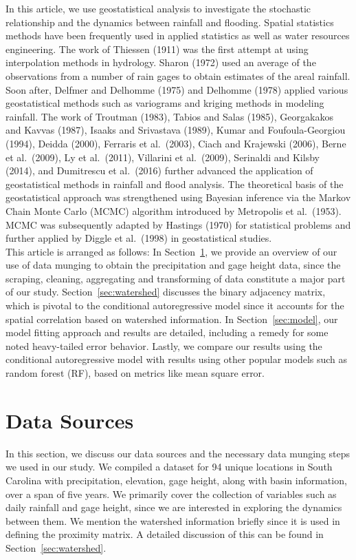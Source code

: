 \documentclass{svjour3}
\renewcommand\hl[1]{#1}
\begin{document}
In this article, we use geostatistical analysis to  investigate the stochastic relationship and  the dynamics between rainfall and flooding.
Spatial statistics methods have been frequently used in applied statistics as well as water resources engineering.
The work of Thiessen (1911) was the first attempt at using interpolation methods in hydrology.
Sharon (1972) used an average of the observations from a number of rain gages to obtain estimates of the areal rainfall.
Soon after,  Delfmer and Delhomme (1975) and Delhomme (1978) applied various geostatistical methods such as variograms and kriging methods in modeling rainfall.
The work of Troutman (1983), Tabios and Salas (1985), Georgakakos and Kavvas (1987), Isaaks and Srivastava (1989), Kumar and Foufoula-Georgiou (1994), Deidda (2000), Ferraris et al.\ (2003), Ciach and Krajewski (2006), Berne et al.\ (2009),  Ly et al.\ (2011), \hl{Villarini} et al.\ (2009), \hl{Serinaldi} and Kilsby (2014), and Dumitrescu et al.\ (2016) further advanced the application of geostatistical methods in rainfall and flood analysis.
The theoretical basis of the geostatistical approach was strengthened using Bayesian inference via the Markov Chain Monte Carlo (MCMC) algorithm introduced by Metropolis et al.\ (1953).
MCMC was subsequently adapted by Hastings (1970) for statistical problems and further applied by Diggle et al.\ (1998) in geostatistical studies.\\

This article is arranged as follows: In Section~\ref{sec:source}, we provide an overview of our use of data munging to obtain the precipitation and gage height data, since the scraping, cleaning, aggregating and transforming of data constitute a major part of our study.
Section~\ref{sec:watershed} discusses the binary adjacency matrix, which is pivotal to the conditional autoregressive model since it accounts for the spatial correlation based on watershed information.
In Section~\ref{sec:model}, our model fitting approach and results are detailed, including a remedy for some noted heavy-tailed error behavior.
Lastly, we compare our results using the conditional autoregressive model with results using other popular models such as random forest (RF), based on metrics like mean square error.

\section{Data Sources}\label{sec:source}

In this section, we discuss our data sources and the necessary data munging steps we used in our study.
We compiled a dataset for 94 unique locations in South Carolina with precipitation, elevation, gage height, along with basin information, over a span of five years.
We primarily cover the collection of variables such as daily rainfall and gage height, since we are interested in exploring the dynamics between them.
We mention the watershed information briefly since it is used in defining the proximity matrix.
A detailed discussion of this can be found in Section~\ref{sec:watershed}.
\end{document}
